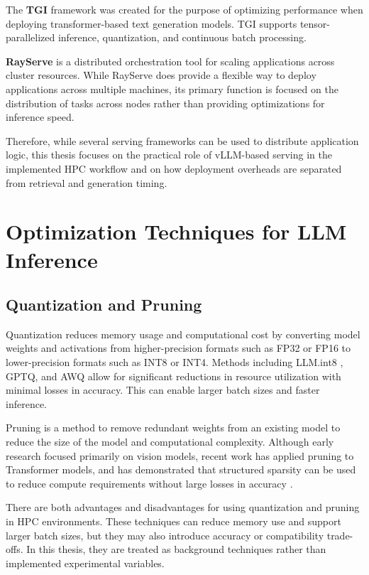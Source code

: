 The \textbf{\acf{TGI}} framework was created for the purpose of optimizing performance when deploying transformer-based text generation models. \ac{TGI} supports tensor-parallelized inference, quantization, and continuous batch processing.

\textbf{RayServe} is a distributed orchestration tool for scaling applications across cluster resources. While RayServe does provide a flexible way to deploy applications across multiple machines, its primary function is focused on the distribution of tasks across nodes rather than providing optimizations for inference speed. 

Therefore, while several serving frameworks can be used to distribute application logic, this thesis focuses on the practical role of \ac{vLLM}-based serving in the implemented \ac{HPC} workflow and on how deployment overheads are separated from retrieval and generation timing.

\section{Optimization Techniques for LLM Inference}

\subsection{Quantization and Pruning}

Quantization reduces memory usage and computational cost by converting model weights and activations from higher-precision formats such as \ac{FP32} or \ac{FP16} to lower-precision formats such as \ac{INT8} or \ac{INT4}. Methods including LLM.int8 \cite{dettmers2022int8}, \ac{GPTQ}, and \ac{AWQ} allow for significant reductions in resource utilization with minimal losses in accuracy. This can enable larger batch sizes and faster inference.

Pruning is a method to remove redundant weights from an existing model to reduce the size of the model and computational complexity. Although early research focused primarily on vision models, recent work has applied pruning to Transformer models, and has demonstrated that structured sparsity can be used to reduce compute requirements without large losses in accuracy \cite{frankle2019lottery}.

There are both advantages and disadvantages for using quantization and pruning in \ac{HPC} environments. These techniques can reduce memory use and support larger batch sizes, but they may also introduce accuracy or compatibility trade-offs. In this thesis, they are treated as background techniques rather than implemented experimental variables.

